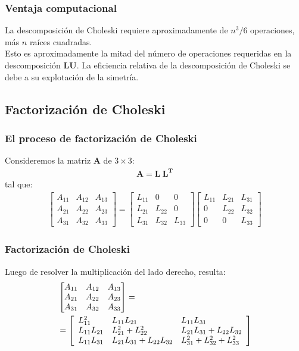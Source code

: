 \documentclass[12pt]{beamer}
\begin{document}
\begin{frame}
\frametitle{Ventaja computacional}
La descomposición de Choleski requiere aproximadamente de $n^{3}/6$ operaciones, más $n$ raíces cuadradas.
\\
\bigskip
\pause
Esto es aproximadamente la mitad del número de operaciones requeridas en la descomposición $\mathbf{LU}$. La eficiencia relativa de la descomposición de Choleski se debe a su explotación de la simetría.
\end{frame}

\subsection{Factorización de Choleski}

\begin{frame}
\frametitle{El proceso de factorización de Choleski}
Consideremos la matriz $\mathbf{A}$ de $3 \times 3$:
\pause
\begin{align*}
\mathbf{A = L \: L^{T}}
\end{align*}
tal que:
\pause
\begin{align*}
\begin{bmatrix}
A_{11} & A_{12} & A_{13} \\
A_{21} & A_{22} & A_{23} \\
A_{31} & A_{32} & A_{33}
\end{bmatrix}
= \begin{bmatrix}
L_{11} & 0      & 0 \\
L_{21} & L_{22} & 0 \\
L_{31} & L_{32} & L_{33}
\end{bmatrix}
\begin{bmatrix}
L_{11} & L_{21} & L_{31} \\
0      & L_{22} & L_{32} \\
0      & 0      & L_{33}
\end{bmatrix}
\end{align*}
\end{frame}
\begin{frame}[fragile]
\frametitle{Factorización de Choleski}
Luego de resolver la multiplicación del lado derecho, resulta:
\fontsize{12}{12}\selectfont
\pause
\begin{align*}
&{}\begin{bmatrix}
A_{11} & A_{12} & A_{13} \\
A_{21} & A_{22} & A_{23} \\
A_{31} & A_{32} & A_{33}
\end{bmatrix} = \\
&{}= \left[ \begin{array}{l l l}
L_{11}^{2} & L_{11} L_{21} & L_{11} L_{31} \\
L_{11} L_{21} & L_{21}^{2} + L_{22}^{2} & L_{21} L_{31} + L_{22} L_{32} \\
L_{11} L_{31} & L_{21} L_{31} + L_{22} L_{32} & L_{31}^{2} + L_{32}^{2} + L_{33}^{2}
\end{array} \right]
\end{align*}
\end{frame}
\end{document}
